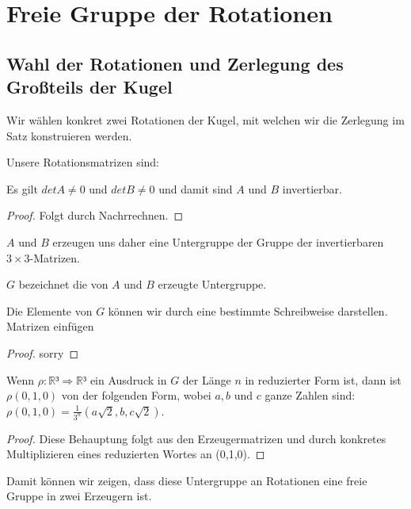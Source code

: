 \chapter{Freie Gruppe der Rotationen}


\section{Wahl der Rotationen und Zerlegung des Großteils der Kugel}




Wir wählen konkret zwei Rotationen der Kugel, mit welchen wir die Zerlegung im Satz konstruieren werden.
\begin{definition}\label{def:konk_rot}
\leanok {}
Unsere Rotationsmatrizen sind: 

\end{definition}

\begin{lemma} \label{lemma:a_b_invertierbar}
Es gilt $det A\neq 0$ und $det B\neq 0$ und damit sind $A$ und $B$ invertierbar.
\leanok
\end{lemma}
\begin{proof}  \leanok 
Folgt durch Nachrrechnen.
\end{proof}

$A$ und $B$ erzeugen uns daher eine Untergruppe der Gruppe der invertierbaren $3\times3$-Matrizen.
\begin{definition}\label{def:konk_rot_erzeugt} 
$G$ bezeichnet die von $A$ und $B$ erzeugte Untergruppe.
\leanok {}
\end{definition}

\begin{lemma}\label{lem:darst_von_rot_matrix}
Die Elemente von $G$ können wir durch eine bestimmte Schreibweise darstellen.
Matrizen einfügen
\end{lemma}
\begin{proof}
sorry
\end{proof}

\begin{lemma}\label{lem:darst_von_rot_res}
\leanok
Wenn $\rho : \mathbb{R}³\Rightarrow\mathbb{R}³$ ein Ausdruck in $G$ der Länge 
$n$ in reduzierter Form ist, dann ist $\rho(0,1,0)$ von der folgenden Form, wobei
$a, b$ und $c$ ganze Zahlen sind: $\rho(0,1,0)=\frac{1}{3^n}(a\sqrt{2},b,c\sqrt{2})$.
\end{lemma}
\begin{proof} 
\leanok Diese Behauptung folgt aus den Erzeugermatrizen
und durch konkretes Multiplizieren eines reduzierten Wortes an (0,1,0).
\end{proof}
Damit können wir zeigen, dass diese Untergruppe an Rotationen eine freie Gruppe in zwei Erzeugern ist.


